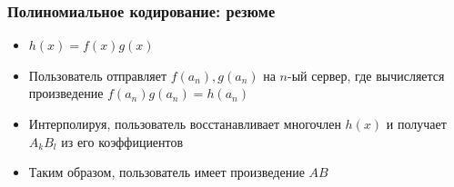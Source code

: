 \documentclass{beamer}
\begin{document}
\begin{frame}
    \frametitle{Полиномиальное кодирование: резюме}

    \begin{itemize}
        \item<1-> $h(x) = f(x)g(x)$ 
        \item<2-> Пользователь отправляет $f(a_n), g(a_n)$ на $n$-ый сервер, где вычисляется произведение $f(a_n)g(a_n) = h(a_n)$
        \item<3-> Интерполируя, пользователь восстанавливает многочлен $h(x)$ и получает $A_k B_l$ из его коэффициентов
        \item<4-> Таким образом, пользователь имеет произведение $AB$

    \end{itemize}

\end{frame}
\end{document}
